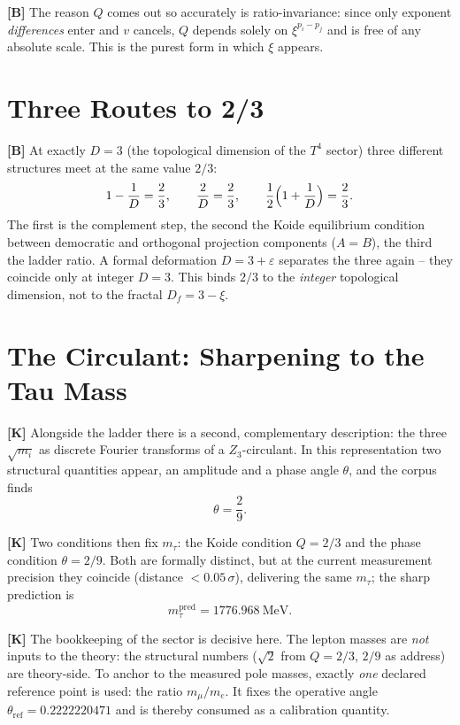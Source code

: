\textbf{[B]} The reason $Q$ comes out so accurately is ratio-invariance: since
only exponent \emph{differences} enter and $v$ cancels, $Q$ depends solely on
$\xi^{p_i-p_j}$ and is free of any absolute scale. This is the purest form in
which $\xi$ appears.

\section{Three Routes to 2/3}

\textbf{[B]} At exactly $D=3$ (the topological dimension of the $T^4$ sector)
three different structures meet at the same value $2/3$:
\[
  1 - \frac1D = \frac23, \qquad \frac2D = \frac23, \qquad
  \frac12\Bigl(1+\frac1D\Bigr) = \frac23.
\]
The first is the complement step, the second the Koide equilibrium condition
between democratic and orthogonal projection components ($A=B$), the third
the ladder ratio. A formal deformation $D=3+\varepsilon$ separates the three again
-- they coincide only at integer $D=3$. This binds $2/3$ to the
\emph{integer} topological dimension, not to the fractal $D_f=3-\xi$.

\section{The Circulant: Sharpening to the Tau Mass}

\textbf{[K]} Alongside the ladder there is a second, complementary description:
the three $\sqrt{m_i}$ as discrete Fourier transforms of a
$Z_3$-circulant. In this representation two structural quantities appear,
an amplitude and a phase angle $\theta$, and the corpus finds
\[
  \theta = \frac29.
\]

\textbf{[K]} Two conditions then fix $m_\tau$: the Koide condition
$Q=2/3$ and the phase condition $\theta=2/9$. Both are formally distinct,
but at the current measurement precision they coincide (distance
$<0{.}05\,\sigma$), delivering the same $m_\tau$; the sharp prediction is
\[
  m_\tau^\text{pred} = 1776{.}968\ \text{MeV}.
\]

\textbf{[K]} The bookkeeping of the sector is decisive here. The lepton masses
are \emph{not} inputs to the theory: the structural numbers
($\sqrt2$ from $Q=2/3$, $2/9$ as address) are theory-side. To anchor
to the measured pole masses, exactly \emph{one} declared reference point is used:
the ratio $m_\mu/m_e$. It fixes the operative angle
$\theta_\text{ref} = 0{.}2222220471$ and is thereby consumed as a calibration quantity.

